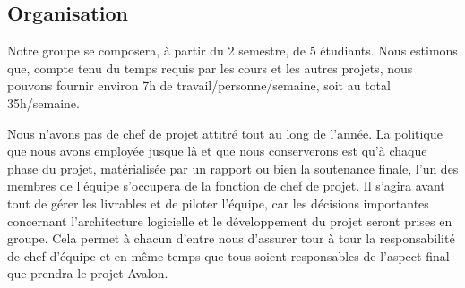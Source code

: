 \subsection{Organisation}

Notre groupe se composera, à partir du 2 semestre, de 5 étudiants. Nous estimons que, compte tenu du temps requis par les cours et les autres projets, nous pouvons fournir environ 7h de travail/personne/semaine, soit au total 35h/semaine. \newline

Nous n'avons pas de chef de projet attitré tout au long de l'année. La politique que nous avons employée jusque là et que nous conserverons est qu'à chaque phase du projet, matérialisée par un rapport ou bien la soutenance finale, l'un des membres de l'équipe s'occupera de la fonction de chef de projet. Il s'agira avant tout de gérer les livrables et de piloter l'équipe, car les décisions importantes concernant l'architecture logicielle et le développement du projet seront prises en groupe. Cela permet à chacun d'entre nous d'assurer tour à tour la responsabilité de chef d'équipe et en même temps que tous soient responsables de l'aspect final que prendra le projet Avalon. 